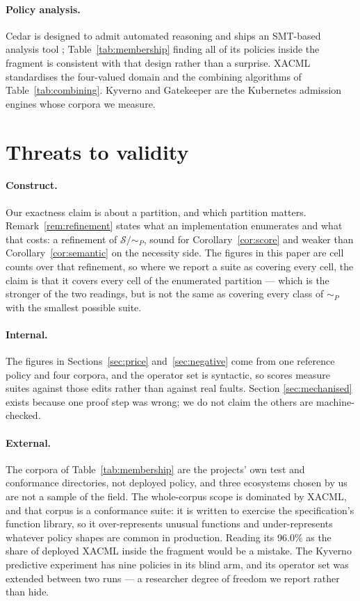 \documentclass[11pt,a4paper]{article}
\theoremstyle{plain}
\theoremstyle{definition}
\theoremstyle{remark}
\newcommand{\Sub}{\mathcal{S}}
\begin{document}
\paragraph{Policy analysis.} Cedar is designed to admit automated reasoning and ships an
SMT-based analysis tool \cite{cedar2024}; Table~\ref{tab:membership} finding all of its
policies inside the fragment is consistent with that design rather than a surprise. XACML
\cite{xacml30} standardises the four-valued domain and the combining algorithms of
Table~\ref{tab:combining}. Kyverno \cite{kyverno} and Gatekeeper \cite{gatekeeper} are the
Kubernetes admission engines whose corpora we measure.

\section{Threats to validity}

\paragraph{Construct.} Our exactness claim is about a partition, and which partition matters.
Remark~\ref{rem:refinement} states what an implementation enumerates and what that costs:
a refinement of $\Sub/{\sim_P}$, sound for Corollary~\ref{cor:score} and weaker than
Corollary~\ref{cor:semantic} on the necessity side. The figures in this paper are cell
counts over that refinement, so where we report a suite as covering every cell, the claim is
that it covers every cell of the enumerated partition --- which is the stronger of the two
readings, but is not the same as covering every class of $\sim_P$ with the smallest possible
suite.

\paragraph{Internal.} The figures in Sections~\ref{sec:price} and~\ref{sec:negative} come
from one reference policy and four corpora, and the operator set is syntactic, so scores
measure suites against those edits rather than against real faults. Section
\ref{sec:mechanised} exists because one proof step was wrong; we do not claim the others are
machine-checked.

\paragraph{External.} The corpora of Table~\ref{tab:membership} are the projects' own test
and conformance directories, not deployed policy, and three ecosystems chosen by us are not a
sample of the field. The whole-corpus scope is dominated by XACML, and that corpus is a
conformance suite: it is written to exercise the specification's function library, so it
over-represents unusual functions and under-represents whatever policy shapes are common in
production. Reading its 96.0\% as the share of deployed XACML inside the fragment would be a
mistake. The Kyverno predictive experiment has nine policies in its blind arm, and its operator
set was extended between two runs --- a researcher degree of freedom we report rather than
hide.
\end{document}
